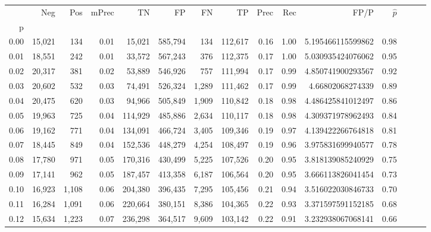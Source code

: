\begin{tabular}{rrrrrrrrrrrrrrr}
\toprule
{} &     Neg &    Pos & mPrec &       TN &       FP &       FN &       TP &  Prec &   Rec &                  FP/P & $\hat{p}$ \\
p    &         &        &       &          &          &          &          &       &       &                       &           \\
\midrule
0.00 &  15,021 &    134 &  0.01 &   15,021 &  585,794 &      134 &  112,617 &  0.16 &  1.00 &     5.195466115599862 &      0.98 \\
0.01 &  18,551 &    242 &  0.01 &   33,572 &  567,243 &      376 &  112,375 &  0.17 &  1.00 &     5.030935424076062 &      0.95 \\
0.02 &  20,317 &    381 &  0.02 &   53,889 &  546,926 &      757 &  111,994 &  0.17 &  0.99 &     4.850741900293567 &      0.92 \\
0.03 &  20,602 &    532 &  0.03 &   74,491 &  526,324 &    1,289 &  111,462 &  0.17 &  0.99 &      4.66802068274339 &      0.89 \\
0.04 &  20,475 &    620 &  0.03 &   94,966 &  505,849 &    1,909 &  110,842 &  0.18 &  0.98 &     4.486425841012497 &      0.86 \\
0.05 &  19,963 &    725 &  0.04 &  114,929 &  485,886 &    2,634 &  110,117 &  0.18 &  0.98 &     4.309371978962493 &      0.84 \\
0.06 &  19,162 &    771 &  0.04 &  134,091 &  466,724 &    3,405 &  109,346 &  0.19 &  0.97 &     4.139422266764818 &      0.81 \\
0.07 &  18,445 &    849 &  0.04 &  152,536 &  448,279 &    4,254 &  108,497 &  0.19 &  0.96 &     3.975831699940577 &      0.78 \\
0.08 &  17,780 &    971 &  0.05 &  170,316 &  430,499 &    5,225 &  107,526 &  0.20 &  0.95 &     3.818139085240929 &      0.75 \\
0.09 &  17,141 &    962 &  0.05 &  187,457 &  413,358 &    6,187 &  106,564 &  0.20 &  0.95 &     3.666113826041454 &      0.73 \\
0.10 &  16,923 &  1,108 &  0.06 &  204,380 &  396,435 &    7,295 &  105,456 &  0.21 &  0.94 &     3.516022030846733 &      0.70 \\
0.11 &  16,284 &  1,091 &  0.06 &  220,664 &  380,151 &    8,386 &  104,365 &  0.22 &  0.93 &     3.371597591152185 &      0.68 \\
0.12 &  15,634 &  1,223 &  0.07 &  236,298 &  364,517 &    9,609 &  103,142 &  0.22 &  0.91 &     3.232938067068141 &      0.66 \\

\end{tabular}
